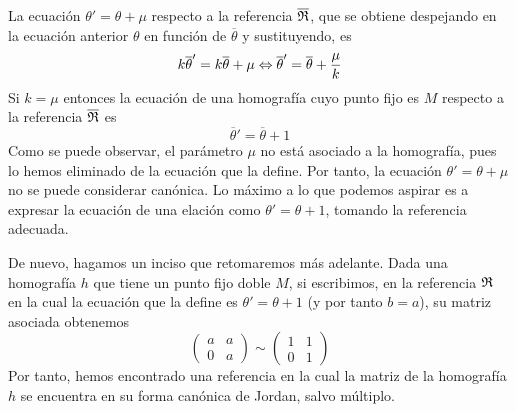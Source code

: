 La ecuación $\theta'=\theta+\mu$ respecto a la referencia $\overline{\mathfrak{R}}$, que se obtiene despejando en la ecuación anterior $\theta$ en función de $\overline{\theta}$ y sustituyendo, es
\begin{equation*}
	k\overline{\theta}'=k\overline{\theta}+\mu\Leftrightarrow \overline{\theta}'=\overline{\theta}+\frac{\mu}{k}
\end{equation*}
Si $k=\mu$ entonces la ecuación de una homografía cuyo punto fijo es $M$ respecto a la referencia $\overline{\mathfrak{R}}$ es
\begin{equation*}
	\overline{\theta}'=\overline{\theta}+1
\end{equation*}
Como se puede observar, el parámetro $\mu$ no está asociado a la homografía, pues lo hemos eliminado de la ecuación que la define. Por tanto, la ecuación $\theta'=\theta+\mu$ no se puede considerar canónica. Lo máximo a lo que podemos aspirar es a expresar la ecuación de una elación como $\theta'=\theta+1$, tomando la referencia adecuada.

De nuevo, hagamos un inciso que retomaremos más adelante. Dada una homografía $h$ que tiene un punto fijo doble $M$, si escribimos, en la referencia $\mathfrak{R}$ en la cual la ecuación que la define es $\theta'=\theta+1$ (y por tanto $b=a$), su matriz asociada obtenemos
\begin{equation*}
\left( \begin{array}{cc}
a&a\\
0&a
\end{array}\right) 
\sim \left( \begin{array}{cc}
1&1\\
0&1
\end{array}\right) 
\end{equation*}
Por tanto, hemos encontrado una referencia en la cual la matriz de la homografía $h$ se encuentra en su forma canónica de Jordan, salvo múltiplo.